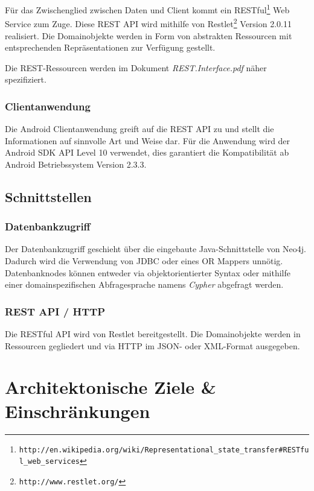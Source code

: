 \documentclass[10pt,a4paper]{scrartcl}
\begin{document}
Für das Zwischenglied zwischen Daten und Client kommt ein
RESTful\footnote{\texttt{http://en.wikipedia.org/wiki/Representational\_state\_transfer\#RESTful\_web\_services}}
Web Service zum Zuge. Diese REST API wird mithilfe von
Restlet\footnote{\texttt{http://www.restlet.org/}}  Version 2.0.11 realisiert. Die Domainobjekte werden in Form von
abstrakten Ressourcen mit entsprechenden Repräsentationen zur Verfügung gestellt.

Die REST-Ressourcen werden im Dokument \textit{REST.Interface.pdf} näher spezifiziert.

\subsubsection{Clientanwendung}

Die Android Clientanwendung greift auf die REST API zu und stellt die Informationen auf sinnvolle Art und Weise dar. Für die Anwendung wird der Android SDK API Level 10 verwendet, dies garantiert die Kompatibilität ab Android Betriebssystem Version 2.3.3.


\subsection{Schnittstellen}

\subsubsection{Datenbankzugriff}

Der Datenbankzugriff geschieht über die eingebaute Java-Schnittstelle von Neo4j. Dadurch wird die
Verwendung von JDBC oder eines OR Mappers unnötig. Datenbanknodes können entweder via
objektorientierter Syntax oder mithilfe einer domainspezifischen Abfragesprache namens
\textit{Cypher} abgefragt werden.

\subsubsection{REST API / HTTP}

Die RESTful API wird von Restlet bereitgestellt. Die Domainobjekte werden in Ressourcen gegliedert
und via HTTP im JSON- oder XML-Format ausgegeben.


\section{Architektonische Ziele \& Einschränkungen}
\end{document}
